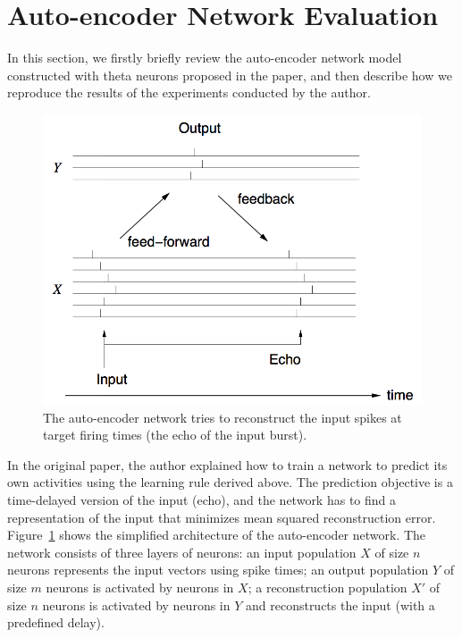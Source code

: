 \section{Auto-encoder Network Evaluation}

In this section, we firstly briefly review the auto-encoder network model constructed with theta neurons
proposed in the paper, and then describe how we reproduce the results of the experiments conducted by the author.

\begin{figure}
\centering
\includegraphics[width=0.98\columnwidth]{network}
\caption{The auto-encoder network tries to reconstruct the input spikes at target firing times (the echo of the input burst).
}
\label{auto_encoder}
\end{figure}

In the original paper, the author explained how to train a network to predict its own activities using the learning rule derived above. 
The prediction objective is a time-delayed version of the input (echo), 
and the network has to find a representation of the input that minimizes mean squared reconstruction error.
Figure~\ref{auto_encoder} shows the simplified architecture of the auto-encoder network.
The network consists of three layers of neurons: 
an input population $X$ of size $n$ neurons represents the input vectors using spike times; 
an output population $Y$ of size $m$ neurons is activated by neurons in $X$; 
a reconstruction population $X'$ of size $n$ neurons is activated by neurons in $Y$ and reconstructs the input (with a predefined delay).


